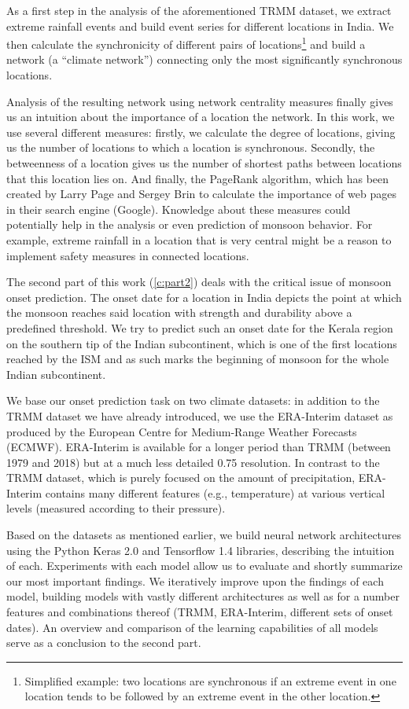As a first step in the analysis of the aforementioned TRMM dataset, we extract extreme rainfall events and build event series for different locations in India. We then calculate the synchronicity of different pairs of locations\footnote{Simplified example: two locations are synchronous if an extreme event in one location tends to be followed by an extreme event in the other location.} and build a network (a ``climate network'') connecting only the most significantly synchronous locations.

Analysis of the resulting network using network centrality measures finally gives us an intuition about the importance of a location the network. In this work, we use several different measures: firstly, we calculate the degree of locations, giving us the number of locations to which a location is synchronous. Secondly, the betweenness of a location gives us the number of shortest paths between locations that this location lies on. And finally, the PageRank algorithm, which has been created by Larry Page and Sergey Brin to calculate the importance of web pages in their search engine (Google). Knowledge about these measures could potentially help in the analysis or even prediction of monsoon behavior. For example, extreme rainfall in a location that is very central might be a reason to implement safety measures in connected locations.

The second part of this work (\cref{c:part2}) deals with the critical issue of monsoon onset prediction. The onset date for a location in India depicts the point at which the monsoon reaches said location with strength and durability above a predefined threshold. We try to predict such an onset date for the Kerala region on the southern tip of the Indian subcontinent, which is one of the first locations reached by the ISM and as such marks the beginning of monsoon for the whole Indian subcontinent.

We base our onset prediction task on two climate datasets: in addition to the TRMM dataset we have already introduced, we use the ERA-Interim dataset as produced by the European Centre for Medium-Range Weather Forecasts (ECMWF). ERA-Interim is available for a longer period than TRMM (between 1979 and 2018) but at a much less detailed {0.75\degree} resolution. In contrast to the TRMM dataset, which is purely focused on the amount of precipitation, ERA-Interim contains many different features (e.g., temperature) at various vertical levels (measured according to their pressure).

Based on the datasets as mentioned earlier, we build neural network architectures using the Python Keras 2.0 and Tensorflow 1.4 libraries, describing the intuition of each. Experiments with each model allow us to evaluate and shortly summarize our most important findings. We iteratively improve upon the findings of each model, building models with vastly different architectures as well as for a number features and combinations thereof (TRMM, ERA-Interim, different sets of onset dates). An overview and comparison of the learning capabilities of all models serve as a conclusion to the second part.

